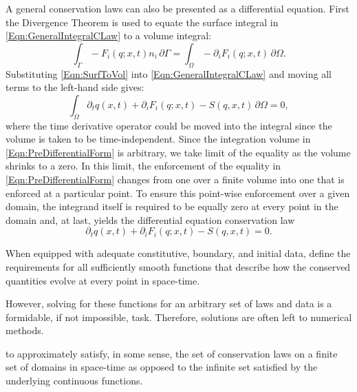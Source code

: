 \documentclass[Prelim,12pt]{WisconsinThesis}
\newcommand{\pdt}{\partial_t}
\newcommand{\pdi}{\partial_i}
\newcommand{\V}  {\ensuremath{\Omega}}
\newcommand{\dV} {\,\partial\V}
\newcommand{\IntV} {\int_{\V}}
\renewcommand{\S}  {\ensuremath{\Gamma}}
\newcommand{\dS} {\,\partial\S}
\newcommand{\IntS} {\int_{\S}}
\newcommand{\q}{\ensuremath{q}}
\begin{document}
A general conservation laws can also be presented as a differential equation.
First the Divergence Theorem is used to equate the surface integral in \cref{Eqn:GeneralIntegralCLaw} to a volume integral:
\begin{equation}
    \IntS -F_i(q;x,t) n_i\dS = \IntV - \pdi F_i(q;x,t) \dV.
    \label{Eqn:SurfToVol}
\end{equation}
Substituting \cref{Eqn:SurfToVol} into \cref{Eqn:GeneralIntegralCLaw} and moving all terms to the left-hand side gives:
\begin{equation}%
    \IntV \pdt\q(x,t) + \pdi F_i(q;x,t) - S(q,x,t) \dV = 0,
    \label{Eqn:PreDifferentialForm}
\end{equation}
where the time derivative operator could be moved into the integral since the volume is taken to be time-independent.
Since the integration volume in \cref{Eqn:PreDifferentialForm} is arbitrary, we take limit of the equality as the volume shrinks to a zero.
In this limit, the enforcement of the equality in \cref{Eqn:PreDifferentialForm} changes from one over a finite volume into one that is enforced at a particular point.
To ensure this point-wise enforcement over a given domain, the integrand itself is required to be equally zero at every point in the domain and, at last, yields the differential equation conservation law
\begin{equation}
    \pdt\q(x,t) + \pdi F_i(q;x,t) - S(q,x,t) = 0.
    \label{Eqn:GeneralDifferentialCLaw}
\end{equation}


When equipped with adequate constitutive, boundary, and initial data, define the requirements for all sufficiently smooth functions that describe how the conserved quantities evolve at every point in space-time.

However, solving for these functions for an arbitrary set of laws and data is a formidable, if not impossible, task.
Therefore, solutions are often left to numerical methods.

to approximately satisfy, in some sense, the set of conservation laws on a finite set of domains in space-time as opposed to the infinite set satisfied by the underlying continuous functions.
\end{document}
